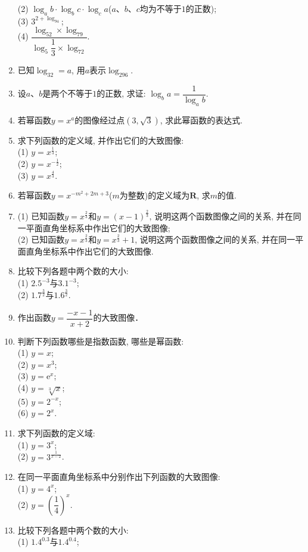 \documentclass[10pt,a4paper]{article}
\begin{document}
\begin{enumerate}[1.]
(2) $\log_ab\cdot\log_bc\cdot\log_ca$($a$、$b$、$c$均为不等于$1$的正数);\\
(3) $3^{2+\log_94}$;\\
(4) $\dfrac{\log_52\times\log_79}{\log_5\dfrac 13\times\log_72}$.
\item 已知$\log_32=a$, 用$a$表示$\log_296$.
\item 设$a$、$b$是两个不等于$1$的正数, 求证: $\log_ba=\dfrac1{\log_ab}$.
\item 若幂函数$y=x^a$的图像经过点$(3, \sqrt 3)$, 求此幂函数的表达式.
\item 求下列函数的定义域, 并作出它们的大致图像:\\
(1) $y=x^{\frac 13}$;\\
(2) $y=x^{-\frac 12}$;\\
(3) $y=x^{\frac 43}$.
\item 若幂函数$y=x^{-m^2+2m+3}$($m$为整数)的定义域为$\mathbf{R}$, 求$m$的值.
\item (1) 已知函数$y=x^{\frac 23}$和$y=(x-1)^{\frac 23}$, 说明这两个函数图像之间的关系, 并在同一平面直角坐标系中作出它们的大致图像;\\
(2) 已知函数$y=x^{\frac 23}$和$y=x^{\frac 23}+1$, 说明这两个函数图像之间的关系, 并在同一平面直角坐标系中作出它们的大致图像.
\item 比较下列各题中两个数的大小:\\
(1) $2.5^{-3}$与$3.1^{-3}$;\\
(2) $1.7^{\frac 32}$与$1.6^{\frac 32}$.
\item 作出函数$y=\dfrac{-x-1}{x+2}$的大致图像．
\item 判断下列函数哪些是指数函数, 哪些是幂函数:\\
(1) $y=x$;\\
(2) $y=x^3$;\\
(3) $y=\mathrm{e}^x$;\\
(4) $y=\sqrt[3]{x}$;\\
(5) $y=2^{-x}$;\\
(6) $y=2^x$.
\item 求下列函数的定义域:\\
(1) $y=3^x$;\\
(2) $y=3^{\frac 1{x-2}}$.
\item 在同一平面直角坐标系中分别作出下列函数的大致图像:\\
(1) $y=4^x$;\\
(2) $y=(\dfrac 14)^x$.
\item 比较下列各题中两个数的大小:\\
(1) $1.4^{0.3}$与$1.4^{0.4}$;\\

\end{enumerate}
\end{document}
